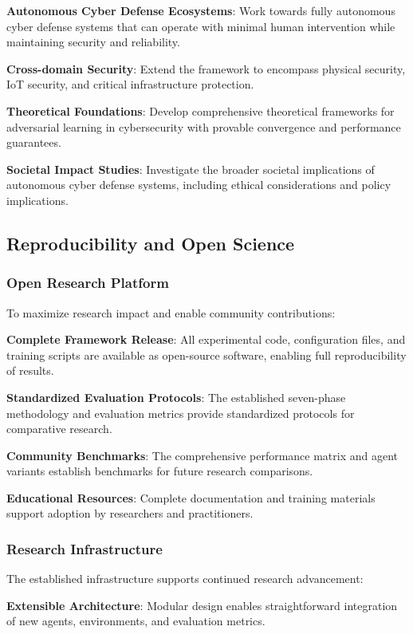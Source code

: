 \documentclass[12pt,twoside]{article}
\begin{document}
\textbf{Autonomous Cyber Defense Ecosystems}: Work towards fully autonomous cyber defense systems that can operate with minimal human intervention while maintaining security and reliability.

\textbf{Cross-domain Security}: Extend the framework to encompass physical security, IoT security, and critical infrastructure protection.

\textbf{Theoretical Foundations}: Develop comprehensive theoretical frameworks for adversarial learning in cybersecurity with provable convergence and performance guarantees.

\textbf{Societal Impact Studies}: Investigate the broader societal implications of autonomous cyber defense systems, including ethical considerations and policy implications.

\subsection{Reproducibility and Open Science}

\subsubsection{Open Research Platform}
To maximize research impact and enable community contributions:

\textbf{Complete Framework Release}: All experimental code, configuration files, and training scripts are available as open-source software, enabling full reproducibility of results.

\textbf{Standardized Evaluation Protocols}: The established seven-phase methodology and evaluation metrics provide standardized protocols for comparative research.

\textbf{Community Benchmarks}: The comprehensive performance matrix and agent variants establish benchmarks for future research comparisons.

\textbf{Educational Resources}: Complete documentation and training materials support adoption by researchers and practitioners.

\subsubsection{Research Infrastructure}
The established infrastructure supports continued research advancement:

\textbf{Extensible Architecture}: Modular design enables straightforward integration of new agents, environments, and evaluation metrics.
\end{document}
